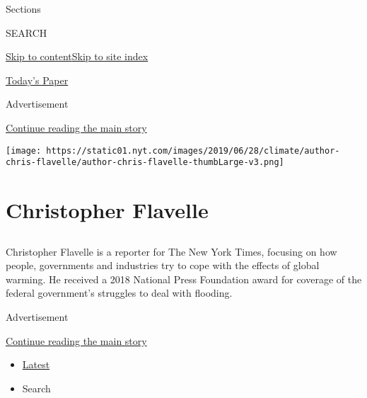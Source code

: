 Sections

SEARCH

\protect\hyperlink{site-content}{Skip to
content}\protect\hyperlink{site-index}{Skip to site index}

\href{https://myaccount.nytimes.com/auth/login?response_type=cookie\&client_id=vi}{}

\href{https://www.nytimes.com/section/todayspaper}{Today's Paper}

Advertisement

\protect\hyperlink{after-top}{Continue reading the main story}

\texttt{[image: https://static01.nyt.com/images/2019/06/28/climate/author-chris-flavelle/author-chris-flavelle-thumbLarge-v3.png]}

\hypertarget{christopher-flavelle}{%
\section{Christopher Flavelle}\label{christopher-flavelle}}

\subsection{}

Christopher Flavelle is a reporter for The New York Times, focusing on
how people, governments and industries try to cope with the effects of
global warming. He received a 2018 National Press Foundation award for
coverage of the federal government's struggles to deal with flooding.

Advertisement

\protect\hyperlink{after-mid1}{Continue reading the main story}

\begin{itemize}
\tightlist
\item
  \protect\hyperlink{stream-panel}{Latest}
\item
  Search
\end{itemize}

